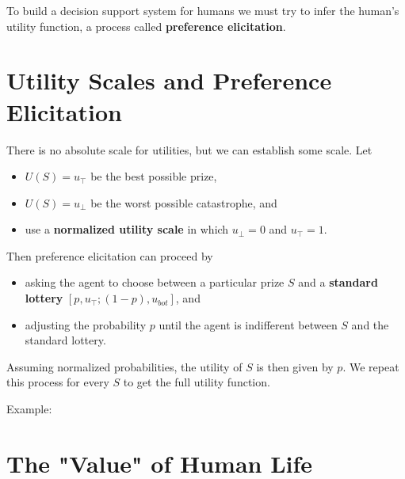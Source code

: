 \documentclass[11pt]{article}
\begin{document}
To build a decision support system for humans we must try to infer the human's utility function, a process called \textbf{preference elicitation}.
\section{Utility Scales and Preference Elicitation}
\label{sec:orgac76a10}

There is no absolute scale for utilities, but we can establish some scale.  Let

\begin{itemize}
\item \(U(S) = u_{\top}\) be the best possible prize,
\item \(U(S) = u_{\bot}\) be the worst possible catastrophe, and
\item use a \textbf{normalized utility scale} in which \(u_{\bot} = 0\) and \(u_{\top} = 1\).
\end{itemize}

Then preference elicitation can proceed by

\begin{itemize}
\item asking the agent to choose between a particular prize \(S\) and a \textbf{standard lottery} \([p, u_{\top}; (1-p), u_{bot}]\), and
\item adjusting the probability \(p\) until the agent is indifferent between \(S\) and the standard lottery.
\end{itemize}

Assuming normalized probabilities, the utility of \(S\) is then given by \(p\).  We repeat this process for every \(S\) to get the full utility function.

Example:
\section{The "Value" of Human Life}
\label{sec:org136a456}
\end{document}
